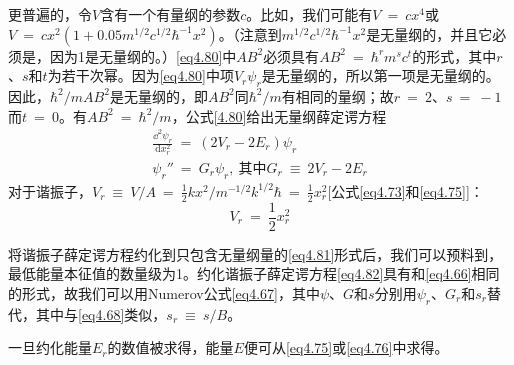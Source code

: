 \documentclass[12pt,a4paper,openany]{ctexbook}
\newcommand{\dd}[1]{\mathrm{d} #1}
\begin{document}
\begin{flushleft}
更普遍的，令$V$含有一个有量纲的参数$c$。比如，我们可能有$V\ =\ cx^4$或$V\ =\ cx^2(1+0.05m^{1/2}c^{1/2}\hbar^{-1}x^2)$。（注意到$m^{1/2}c^{1/2}\hbar^{-1}x^2$是无量纲的，并且它必须是，因为1是无量纲的。）\eqref{eq4.80}中$AB^2$必须具有$AB^2\ =\ \hbar^rm^sc^t$的形式，其中$r$、$s$和$t$为若干次幂。因为\eqref{eq4.80}中项$V_r\psi_r$是无量纲的，所以第一项是无量纲的。因此，$\hbar^2/mAB^2$是无量纲的，即$AB^2$同$\hbar^2/m$有相同的量纲；故$r\ =\ 2$、$s\ =\ -1$而$t\ =\ 0$。有$AB^2\ =\ \hbar^2/m$，公式\eqref{4.80}给出无量纲薛定谔方程
\begin{gather}
    \frac{\dd^2\psi_r}{\dd x_r^2}\ =\ (2V_r-2E_r)\psi_r \label{eq4.81} \\
    \psi_r''\ =\ G_r\psi_r,\ \text{其中}G_r\ \equiv\ 2V_r-2E_r \label{eq4.82}
\end{gather}
对于谐振子，$V_r\ \equiv\ V/A\ =\ \frac{1}{2}kx^2/m^{-1/2}k^{1/2}\hbar\ =\ \frac{1}{2}x_r^2$[公式\eqref{eq4.73}和\eqref{eq4.75}]：
\begin{equation}
    V_r\ =\ \frac{1}{2}x_r^2 \label{eq4.83}
\end{equation}

将谐振子薛定谔方程约化到只包含无量纲量的\eqref{eq4.81}形式后，我们可以预料到，最低能量本征值的数量级为1。约化谐振子薛定谔方程\eqref{eq4.82}具有和\eqref{eq4.66}相同的形式，故我们可以用Numerov公式\eqref{eq4.67}，其中$\psi$、$G$和$s$分别用$\psi_r$、$G_r$和$s_r$替代，其中与\eqref{eq4.68}类似，$s_r\ \equiv\ s/B$。

一旦约化能量$E_r$的数值被求得，能量$E$便可从\eqref{eq4.75}或\eqref{eq4.76}中求得。
\end{flushleft}
\end{document}

